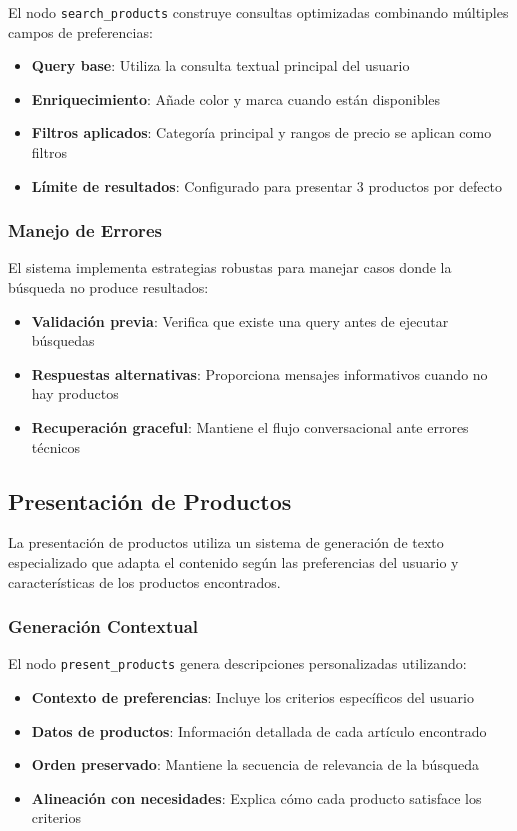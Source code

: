 El nodo \texttt{search\_products} construye consultas optimizadas combinando múltiples campos de preferencias:

\begin{itemize}
    \item \textbf{Query base}: Utiliza la consulta textual principal del usuario
    \item \textbf{Enriquecimiento}: Añade color y marca cuando están disponibles
    \item \textbf{Filtros aplicados}: Categoría principal y rangos de precio se aplican como filtros
    \item \textbf{Límite de resultados}: Configurado para presentar 3 productos por defecto
\end{itemize}

\subsubsection{Manejo de Errores}

El sistema implementa estrategias robustas para manejar casos donde la búsqueda no produce resultados:

\begin{itemize}
    \item \textbf{Validación previa}: Verifica que existe una query antes de ejecutar búsquedas
    \item \textbf{Respuestas alternativas}: Proporciona mensajes informativos cuando no hay productos
    \item \textbf{Recuperación graceful}: Mantiene el flujo conversacional ante errores técnicos
\end{itemize}

\subsection{Presentación de Productos}

La presentación de productos utiliza un sistema de generación de texto especializado que adapta el contenido según las preferencias del usuario y características de los productos encontrados.

\subsubsection{Generación Contextual}

El nodo \texttt{present\_products} genera descripciones personalizadas utilizando:

\begin{itemize}
    \item \textbf{Contexto de preferencias}: Incluye los criterios específicos del usuario
    \item \textbf{Datos de productos}: Información detallada de cada artículo encontrado
    \item \textbf{Orden preservado}: Mantiene la secuencia de relevancia de la búsqueda
    \item \textbf{Alineación con necesidades}: Explica cómo cada producto satisface los criterios
\end{itemize}

